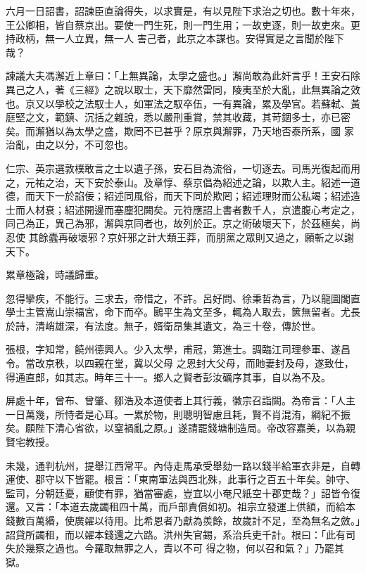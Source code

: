 \begin{pinyinscope}
 六月一日詔書，詔諫臣直論得失，以求實是，有以見陛下求治之切也。數十年來，王公卿相，皆自蔡京出。要使一門生死，則一門生用；一故吏逐，則一故吏來。更持政柄，無一人立異，無一人
 害己者，此京之本謀也。安得實是之言聞於陛下哉？



 諫議大夫馮澥近上章曰：「上無異論，太學之盛也。」澥尚敢為此奸言乎！王安石除異己之人，著《三經》之說以取士，天下靡然雷同，陵夷至於大亂，此無異論之效也。京又以學校之法馭士人，如軍法之馭卒伍，一有異論，累及學官。若蘇軾、黃庭堅之文，範鎮、沉括之雜說，悉以嚴刑重賞，禁其收藏，其苛錮多士，亦已密矣。而澥猶以為太學之盛，欺罔不已甚乎？原京與澥罪，乃天地否泰所系，國
 家治亂，由之以分，不可忽也。



 仁宗、英宗選敦樸敢言之士以遺子孫，安石目為流俗，一切逐去。司馬光復起而用之，元祐之治，天下安於泰山。及章惇、蔡京倡為紹述之論，以欺人主。紹述一道德，而天下一於諂佞；紹述同風俗，而天下同於欺罔；紹述理財而公私竭；紹述造士而人材衰；紹述開邊而塞塵犯闕矣。元符應詔上書者數千人，京遣腹心考定之，同己為正，異己為邪，澥與京同者也，故列於正。京之術破壞天下，於茲極矣，尚忍使
 其餘蠹再破壞邪？京奸邪之計大類王莽，而朋黨之眾則又過之，願斬之以謝天下。



 累章極論，時議歸重。



 忽得攣疾，不能行。三求去，帝惜之，不許。呂好問、徐秉哲為言，乃以龍圖閣直學士主管嵩山崇福宮，命下而卒。鶠平生為文至多，輒為人取去，篋無留者。尤長於詩，清峭雄深，有法度。無子，婿衛昂集其遺文，為三十卷，傳於世。



 張根，字知常，饒州德興人。少入太學，甫冠，第進士。調臨江司理參軍、遂昌令。當改京秩，以四親在堂，冀以父母
 之恩封大父母，而貤妻封及母，遂致仕，得通直郎，如其志。時年三十一。鄉人之賢者彭汝礪序其事，自以為不及。



 屏處十年，曾布、曾肇、鄒浩及本道使者上其行義，徽宗召詣闕。為帝言：「人主一日萬幾，所恃者是心耳。一累於物，則聰明智慮且耗，賢不肖混洧，綱紀不振矣。願陛下清心省欲，以窒禍亂之原。」遂請罷錢塘制造局。帝改容嘉美，以為親賢宅教授。



 未幾，通判杭州，提舉江西常平。內侍走馬承受舉劾一路以錢半給軍衣非是，自轉
 運使、郡守以下皆罷。根言：「東南軍法與西北殊，此事行之百五十年矣。帥守、監司，分朝廷憂，顧使有罪，猶當審處，豈宜以小奄尺紙空十郡吏哉？」詔皆令復還。又言：「本道去歲蠲租四十萬，而戶部責償如初。祖宗立發運上供額，而給本錢數百萬緡，使廣糴以待用。比希恩者乃獻為羨餘，故歲計不足，至為無名之斂。」詔貸所蠲租，而以糴本錢還之六路。洪州失官錫，系治兵吏千計。根曰：「此有司失於幾察之過也。今羅取無罪之人，責以不可
 得之物，何以召和氣？」乃罷其獄。




\end{pinyinscope}
